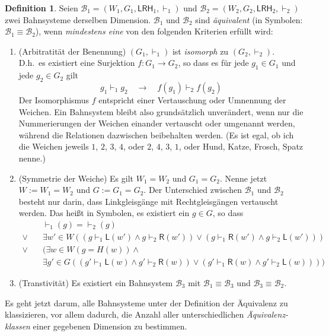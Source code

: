 \documentclass{article}
\theoremstyle{definition}
\newtheorem{defi}{Definition}
\newcommand{\lgang}{\mathsf{L}}
\newcommand{\rgang}{\mathsf{R}}
\newcommand{\connec}{\vdash}
\newcommand{\lrh}{\mathsf{LRH}}
\begin{document}
    \begin{defi}
	Seien $\mathcal{B}_1 = (W_1,G_1,\lrh_1,\connec_1)$ und $\mathcal{B}_2 = (W_2,G_2,\lrh_2,\connec_2)$ zwei Bahnsysteme derselben Dimension. $\mathcal{B}_1$ und $\mathcal{B}_2$ sind \textit{äquivalent} (in Symbolen: $\mathcal{B}_1\equiv\mathcal{B}_2$), wenn \textit{mindestens eine} von den folgenden Kriterien erfüllt wird:

	\begin{enumerate}[label=\roman*., ref=(\roman*)]
	    \item (Arbitratität der Benennung) $(G_1,\connec_1)$ ist \textit{isomorph} zu $(G_2,\connec_2)$. D.h.\ es existiert eine Surjektion $f:G_1\to G_2$, so dass es für jede $g_1\in G_1$ und jede $g_2\in G_2$ gilt
		\[ g_1\connec_1 g_2 \quad\to\quad f(g_1)\connec_2 f(g_2) \]
		Der Isomorphismus $f$ entspricht einer Vertauschung oder Umnennung der Weichen. Ein Bahnsystem bleibt also grundsätzlich unverändert, wenn nur die Nummerierungen der Weichen einander vertauscht oder umgenannt werden, während die Relationen dazwischen beibehalten werden. (Es ist egal, ob ich die Weichen jeweils $1$, $2$, $3$, $4$, oder $2$, $4$, $3$, $1$, oder Hund, Katze, Frosch, Spatz nenne.)
	    \item (Symmetrie der Weiche) Es gilt $W_1=W_2$ und $G_1=G_2$. Nenne jetzt $W:=W_1=W_2$ und $G:=G_1=G_2$. Der Unterschied zwischen $\mathcal{B}_1$ und $\mathcal{B}_2$ besteht nur darin, dass Linkgleisgänge mit Rechtgleisgängen vertauscht werden. Das heißt in Symbolen, es existiert ein $g\in G$, so dass
		\begin{align*}
		    \quad&{\connec_1}(g) = {\connec_2}(g) \\
		    \lor\quad &\exists w'\in W((g\connec_1\lgang(w')\land g\connec_2\rgang(w'))\lor(g\connec_1\rgang(w')\land g\connec_2\lgang(w'))) \\
		    \lor\quad &(\exists w\in W(g=H(w))\land\\
			      &\exists g'\in G((g'\connec_1\lgang(w)\land g'\connec_2\rgang(w))\lor(g'\connec_1\rgang(w)\land g'\connec_2\lgang(w))))
		\end{align*}
	    \item (Transtivität) Es existiert ein Bahnsystem $\mathcal{B}_3$ mit $\mathcal{B}_1 \equiv \mathcal{B}_3$ und $\mathcal{B}_3 \equiv \mathcal{B}_2$.
	\end{enumerate}
    \end{defi}

    Es geht jetzt darum, alle Bahnsysteme unter der Definition der Äquivalenz zu klassizieren, vor allem dadurch, die Anzahl aller unterschiedlichen \textit{Äquivalenz-klassen} einer gegebenen Dimension zu bestimmen.
\end{document}
